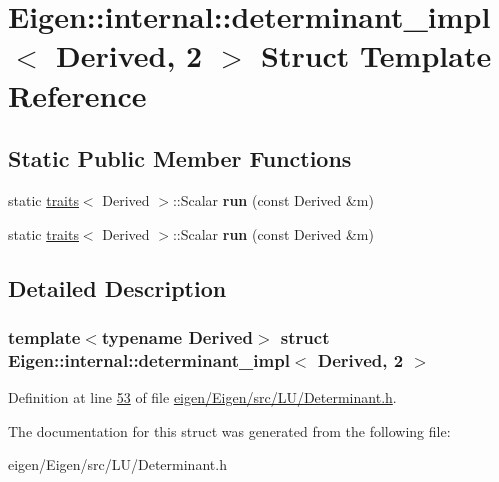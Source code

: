 \hypertarget{struct_eigen_1_1internal_1_1determinant__impl_3_01_derived_00_012_01_4}{}\section{Eigen\+:\+:internal\+:\+:determinant\+\_\+impl$<$ Derived, 2 $>$ Struct Template Reference}
\label{struct_eigen_1_1internal_1_1determinant__impl_3_01_derived_00_012_01_4}
\subsection*{Static Public Member Functions}
\begin{DoxyCompactItemize}
\item 
\mbox{\label{struct_eigen_1_1internal_1_1determinant__impl_3_01_derived_00_012_01_4_af60ec7103c3c1d70822a0846d44b8198}} 
static \hyperlink{struct_eigen_1_1internal_1_1traits}{traits}$<$ Derived $>$\+::Scalar {\bfseries run} (const Derived \&m)
\item 
\mbox{\label{struct_eigen_1_1internal_1_1determinant__impl_3_01_derived_00_012_01_4_af60ec7103c3c1d70822a0846d44b8198}} 
static \hyperlink{struct_eigen_1_1internal_1_1traits}{traits}$<$ Derived $>$\+::Scalar {\bfseries run} (const Derived \&m)
\end{DoxyCompactItemize}


\subsection{Detailed Description}
\subsubsection*{template$<$typename Derived$>$\newline
struct Eigen\+::internal\+::determinant\+\_\+impl$<$ Derived, 2 $>$}



Definition at line \hyperlink{eigen_2_eigen_2src_2_l_u_2_determinant_8h_source_l00053}{53} of file \hyperlink{eigen_2_eigen_2src_2_l_u_2_determinant_8h_source}{eigen/\+Eigen/src/\+L\+U/\+Determinant.\+h}.



The documentation for this struct was generated from the following file\+:\begin{DoxyCompactItemize}
\item 
eigen/\+Eigen/src/\+L\+U/\+Determinant.\+h\end{DoxyCompactItemize}
